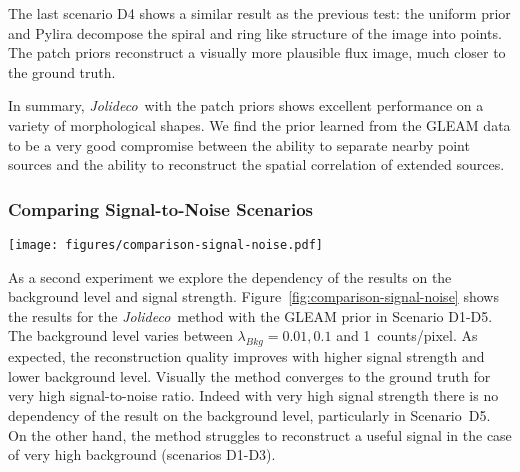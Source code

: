 \documentclass[twocolumn, linenumbers]{aastex631}
\newcommand{\jolideco}{\textit{Jolideco}~}
\begin{document}
    The last scenario D4 shows a similar result as the previous test: the uniform prior and Pylira decompose the spiral and ring like structure of the image into points. The patch priors reconstruct a visually more plausible flux image, much closer to the ground truth.

    In summary, \jolideco with the patch priors shows excellent performance on a variety of morphological shapes. We find the prior learned from the GLEAM data to be a very good compromise between the ability to separate nearby point sources and the ability to reconstruct the spatial correlation of extended sources.
    
    \subsubsection{Comparing Signal-to-Noise Scenarios}
    \begin{figure*}
        \begin{centering}
            \texttt{[image: figures/comparison-signal-noise.pdf]}
            \caption{
                Comparison of \jolideco with the GLEAM v0.1 prior for different background levels and signal strength, as represented by scenario D1-D5. The images are grouped by background level with each pair of columns showing the counts data in the left column and the reconstruction in the right column. The rows show the scenarios D1-D5 as described in Section~\ref{subsec:test-datasets}. Each pair of columns corresponds to a  background level,  \qty[mode = text]{0.001}{cts / pixel}, \qty[mode = text]{0.01}{cts / pixel} and \qty[mode = text]{0.1}{cts / pixel}. The complete results for the simulations and additional information are available at \url{https://jolideco.github.io/jolideco-comparison}.
            }
            \label{fig:comparison-signal-noise}
        \end{centering}
    \end{figure*}
    As a second experiment we explore the dependency of the results on the background level and signal strength. Figure~\ref{fig:comparison-signal-noise} shows the results for the \jolideco method with the GLEAM prior in Scenario D1-D5. The background level varies between $\lambda_{Bkg}= 0.01, 0.1$ and \qty[mode = text]{1}{counts/pixel}. As expected, the reconstruction quality improves with higher signal strength and lower background level. Visually the method converges to the ground truth for very high signal-to-noise ratio. Indeed with very high signal strength there is no dependency of the result on the background level, particularly in Scenario~D5. On the other hand, the method struggles to reconstruct a useful signal in the case of very high background (scenarios D1-D3). 
\end{document}
